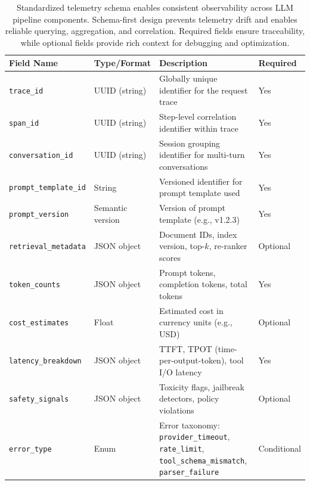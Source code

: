 \begin{table}[t]
\centering
\small
\caption{Standardized telemetry schema enables consistent observability across LLM pipeline components. Schema-first design prevents telemetry drift and enables reliable querying, aggregation, and correlation. Required fields ensure traceability, while optional fields provide rich context for debugging and optimization.}
\label{tab:ch05_telemetry_schema}
\setlength{\tabcolsep}{6pt}
\renewcommand{\arraystretch}{1.3}
\begin{tabularx}{\linewidth}{@{}>{\raggedright\arraybackslash}p{3.5cm}>{\raggedright\arraybackslash}X>{\raggedright\arraybackslash}X>{\raggedright\arraybackslash}p{1.8cm}@{}}
\toprule
\rowcolor{gray!15}
\textbf{Field Name} & \textbf{Type/Format} & \textbf{Description} & \textbf{Required} \\
\midrule
\texttt{trace\_id} & UUID (string) & Globally unique identifier for the request trace & Yes \\
\addlinespace[2pt]
\texttt{span\_id} & UUID (string) & Step-level correlation identifier within trace & Yes \\
\addlinespace[2pt]
\texttt{conversation\_id} & UUID (string) & Session grouping identifier for multi-turn conversations & Yes \\
\addlinespace[2pt]
\texttt{prompt\_template\_id} & String & Versioned identifier for prompt template used & Yes \\
\addlinespace[2pt]
\texttt{prompt\_version} & Semantic version & Version of prompt template (e.g., v1.2.3) & Yes \\
\addlinespace[2pt]
\texttt{retrieval\_metadata} & JSON object & Document IDs, index version, top-$k$, re-ranker scores & Optional \\
\addlinespace[2pt]
\texttt{token\_counts} & JSON object & Prompt tokens, completion tokens, total tokens & Yes \\
\addlinespace[2pt]
\texttt{cost\_estimates} & Float & Estimated cost in currency units (e.g., USD) & Optional \\
\addlinespace[2pt]
\texttt{latency\_breakdown} & JSON object & TTFT, TPOT (time-per-output-token), tool I/O latency & Yes \\
\addlinespace[2pt]
\texttt{safety\_signals} & JSON object & Toxicity flags, jailbreak detectors, policy violations & Optional \\
\addlinespace[2pt]
\texttt{error\_type} & Enum & Error taxonomy: \texttt{provider\_timeout}, \texttt{rate\_limit}, \texttt{tool\_schema\_mismatch}, \texttt{parser\_failure} & Conditional \\
\bottomrule
\end{tabularx}
\end{table}

